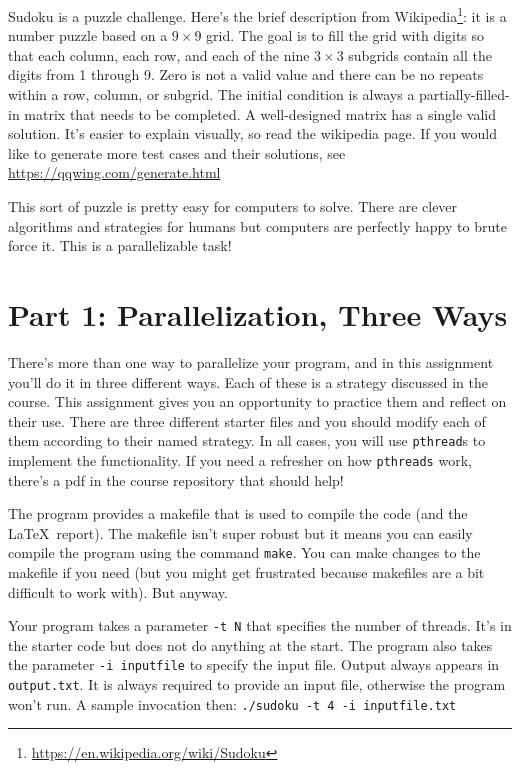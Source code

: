 \documentclass[letterpaper,10pt]{article}
\begin{document}
Sudoku is a puzzle challenge. 
Here's the brief description from Wikipedia\footnote{
\url{https://en.wikipedia.org/wiki/Sudoku}}:
it is a number puzzle based on a $9\times9$ grid. The goal is to fill the
grid with digits so that each column, each row, and each of the nine
$3\times3$ subgrids contain all the digits from 1 through 9. Zero is not
a valid value and there can be no repeats within a row, column, or subgrid. 
The initial condition is always a partially-filled-in matrix that needs to 
be completed. A well-designed matrix has a single valid solution. 
It's easier to explain visually, so read the wikipedia page.
If you would like to generate
more test cases and their solutions, see
\url{https://qqwing.com/generate.html}


This sort of puzzle is pretty easy for computers to solve. There are clever
algorithms and strategies for humans but computers are perfectly happy to
brute force it. This is a parallelizable task!

\newpage

\section*{Part 1: Parallelization, Three Ways}

There's more than one way to parallelize your program, and in this
assignment you'll do it in three different ways. Each of these is a
strategy discussed in the course. This assignment gives you an opportunity
to practice them and reflect on their use. There are three different
starter files and you should modify each of them according to their named
strategy. In all cases, you will use \texttt{pthread}s to implement the 
functionality. If you need a refresher on how \texttt{pthreads} work,
there's a pdf in the course repository that should help! 

The program provides a makefile that is used to compile the code (and the
\LaTeX~report). The makefile isn't super robust but it means you can easily
compile the program using the command \texttt{make}. You can make changes
to the makefile if you need (but you might get frustrated because makefiles
are a bit difficult to work with). But anyway.

Your program takes a parameter \texttt{-t N} that specifies the number 
of threads. It's in the starter code but does not do anything at the start. 
The program also takes the parameter \texttt{-i inputfile} to specify the
input file. Output always appears in \texttt{output.txt}. It is always 
required to provide an input file, otherwise the program won't run.
A sample invocation then: \texttt{./sudoku -t 4 -i inputfile.txt}
\end{document}
